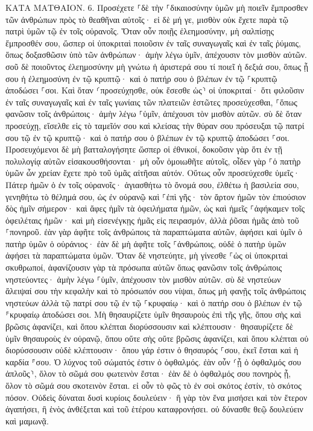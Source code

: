 \documentclass[twoside, 9pt]{extreport}
\begin{document}
ΚΑΤΑ ΜΑΤΘΑΙΟΝ.
6.
Προσέχετε ⸀δὲ τὴν ⸀δικαιοσύνην ὑμῶν μὴ ποιεῖν ἔμπροσθεν τῶν ἀνθρώπων πρὸς τὸ θεαθῆναι αὐτοῖς· εἰ δὲ μή γε, μισθὸν οὐκ ἔχετε παρὰ τῷ πατρὶ ὑμῶν τῷ ἐν τοῖς οὐρανοῖς. 
Ὅταν οὖν ποιῇς ἐλεημοσύνην, μὴ σαλπίσῃς ἔμπροσθέν σου, ὥσπερ οἱ ὑποκριταὶ ποιοῦσιν ἐν ταῖς συναγωγαῖς καὶ ἐν ταῖς ῥύμαις, ὅπως δοξασθῶσιν ὑπὸ τῶν ἀνθρώπων· ἀμὴν λέγω ὑμῖν, ἀπέχουσιν τὸν μισθὸν αὐτῶν. 
σοῦ δὲ ποιοῦντος ἐλεημοσύνην μὴ γνώτω ἡ ἀριστερά σου τί ποιεῖ ἡ δεξιά σου, 
ὅπως ᾖ σου ἡ ἐλεημοσύνη ἐν τῷ κρυπτῷ· καὶ ὁ πατήρ σου ὁ βλέπων ἐν τῷ ⸀κρυπτῷ ἀποδώσει ⸀σοι. 
Καὶ ὅταν ⸂προσεύχησθε, οὐκ ἔσεσθε ὡς⸃ οἱ ὑποκριταί· ὅτι φιλοῦσιν ἐν ταῖς συναγωγαῖς καὶ ἐν ταῖς γωνίαις τῶν πλατειῶν ἑστῶτες προσεύχεσθαι, ⸀ὅπως φανῶσιν τοῖς ἀνθρώποις· ἀμὴν λέγω ⸀ὑμῖν, ἀπέχουσι τὸν μισθὸν αὐτῶν. 
σὺ δὲ ὅταν προσεύχῃ, εἴσελθε εἰς τὸ ταμεῖόν σου καὶ κλείσας τὴν θύραν σου πρόσευξαι τῷ πατρί σου τῷ ἐν τῷ κρυπτῷ· καὶ ὁ πατήρ σου ὁ βλέπων ἐν τῷ κρυπτῷ ἀποδώσει ⸀σοι. 
Προσευχόμενοι δὲ μὴ βατταλογήσητε ὥσπερ οἱ ἐθνικοί, δοκοῦσιν γὰρ ὅτι ἐν τῇ πολυλογίᾳ αὐτῶν εἰσακουσθήσονται· 
μὴ οὖν ὁμοιωθῆτε αὐτοῖς, οἶδεν γὰρ ⸀ὁ πατὴρ ὑμῶν ὧν χρείαν ἔχετε πρὸ τοῦ ὑμᾶς αἰτῆσαι αὐτόν. 
Οὕτως οὖν προσεύχεσθε ὑμεῖς· Πάτερ ἡμῶν ὁ ἐν τοῖς οὐρανοῖς· ἁγιασθήτω τὸ ὄνομά σου, 
ἐλθέτω ἡ βασιλεία σου, γενηθήτω τὸ θέλημά σου, ὡς ἐν οὐρανῷ καὶ ⸀ἐπὶ γῆς· 
τὸν ἄρτον ἡμῶν τὸν ἐπιούσιον δὸς ἡμῖν σήμερον· 
καὶ ἄφες ἡμῖν τὰ ὀφειλήματα ἡμῶν, ὡς καὶ ἡμεῖς ⸀ἀφήκαμεν τοῖς ὀφειλέταις ἡμῶν· 
καὶ μὴ εἰσενέγκῃς ἡμᾶς εἰς πειρασμόν, ἀλλὰ ῥῦσαι ἡμᾶς ἀπὸ τοῦ ⸀πονηροῦ. 
ἐὰν γὰρ ἀφῆτε τοῖς ἀνθρώποις τὰ παραπτώματα αὐτῶν, ἀφήσει καὶ ὑμῖν ὁ πατὴρ ὑμῶν ὁ οὐράνιος· 
ἐὰν δὲ μὴ ἀφῆτε τοῖς ⸀ἀνθρώποις, οὐδὲ ὁ πατὴρ ὑμῶν ἀφήσει τὰ παραπτώματα ὑμῶν. 
Ὅταν δὲ νηστεύητε, μὴ γίνεσθε ⸀ὡς οἱ ὑποκριταὶ σκυθρωποί, ἀφανίζουσιν γὰρ τὰ πρόσωπα αὐτῶν ὅπως φανῶσιν τοῖς ἀνθρώποις νηστεύοντες· ἀμὴν λέγω ⸀ὑμῖν, ἀπέχουσιν τὸν μισθὸν αὐτῶν. 
σὺ δὲ νηστεύων ἄλειψαί σου τὴν κεφαλὴν καὶ τὸ πρόσωπόν σου νίψαι, 
ὅπως μὴ φανῇς τοῖς ἀνθρώποις νηστεύων ἀλλὰ τῷ πατρί σου τῷ ἐν τῷ ⸀κρυφαίῳ· καὶ ὁ πατήρ σου ὁ βλέπων ἐν τῷ ⸁κρυφαίῳ ἀποδώσει σοι. 
Μὴ θησαυρίζετε ὑμῖν θησαυροὺς ἐπὶ τῆς γῆς, ὅπου σὴς καὶ βρῶσις ἀφανίζει, καὶ ὅπου κλέπται διορύσσουσιν καὶ κλέπτουσιν· 
θησαυρίζετε δὲ ὑμῖν θησαυροὺς ἐν οὐρανῷ, ὅπου οὔτε σὴς οὔτε βρῶσις ἀφανίζει, καὶ ὅπου κλέπται οὐ διορύσσουσιν οὐδὲ κλέπτουσιν· 
ὅπου γάρ ἐστιν ὁ θησαυρός ⸀σου, ἐκεῖ ἔσται καὶ ἡ καρδία ⸁σου. 
Ὁ λύχνος τοῦ σώματός ἐστιν ὁ ὀφθαλμός. ἐὰν οὖν ⸂ᾖ ὁ ὀφθαλμός σου ἁπλοῦς⸃, ὅλον τὸ σῶμά σου φωτεινὸν ἔσται· 
ἐὰν δὲ ὁ ὀφθαλμός σου πονηρὸς ᾖ, ὅλον τὸ σῶμά σου σκοτεινὸν ἔσται. εἰ οὖν τὸ φῶς τὸ ἐν σοὶ σκότος ἐστίν, τὸ σκότος πόσον. 
Οὐδεὶς δύναται δυσὶ κυρίοις δουλεύειν· ἢ γὰρ τὸν ἕνα μισήσει καὶ τὸν ἕτερον ἀγαπήσει, ἢ ἑνὸς ἀνθέξεται καὶ τοῦ ἑτέρου καταφρονήσει. οὐ δύνασθε θεῷ δουλεύειν καὶ μαμωνᾷ. 
\end{document}
